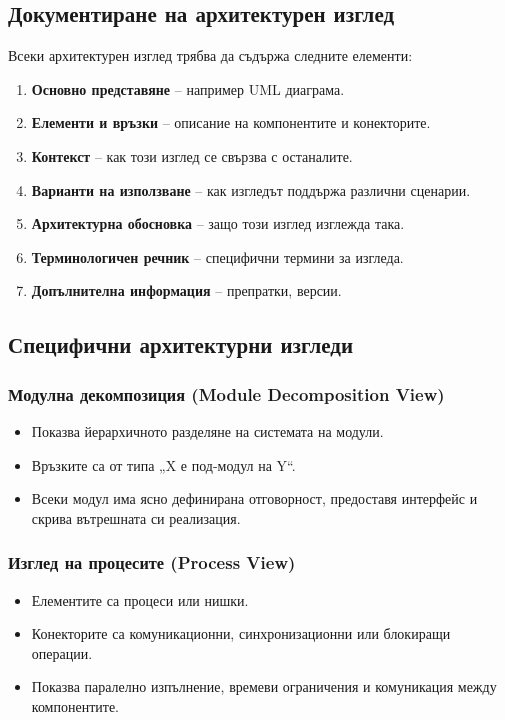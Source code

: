 \documentclass{scrartcl}
\begin{document}
\begin{FlushLeft}
\subsection{Документиране на архитектурен изглед}

Всеки архитектурен изглед трябва да съдържа следните елементи:
\begin{enumerate}
    \item \textbf{Основно представяне} – например UML диаграма.
    \item \textbf{Елементи и връзки} – описание на компонентите и конекторите.
    \item \textbf{Контекст} – как този изглед се свързва с останалите.
    \item \textbf{Варианти на използване} – как изгледът поддържа различни сценарии.
    \item \textbf{Архитектурна обосновка} – защо този изглед изглежда така.
    \item \textbf{Терминологичен речник} – специфични термини за изгледа.
    \item \textbf{Допълнителна информация} – препратки, версии.
\end{enumerate}

\subsection{Специфични архитектурни изгледи}

\subsubsection{Модулна декомпозиция (Module Decomposition View)}
\begin{itemize}
    \item Показва йерархичното разделяне на системата на модули.
    \item Връзките са от типа „X е под-модул на Y“.
    \item Всеки модул има ясно дефинирана отговорност, предоставя интерфейс и скрива вътрешната си реализация.
\end{itemize}

\subsubsection{Изглед на процесите (Process View)}
\begin{itemize}
    \item Елементите са процеси или нишки.
    \item Конекторите са комуникационни, синхронизационни или блокиращи операции.
    \item Показва паралелно изпълнение, времеви ограничения и комуникация между компонентите.
\end{itemize}


\end{FlushLeft}
\end{document}
